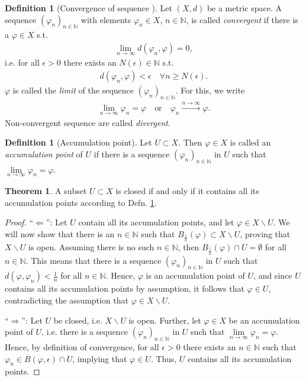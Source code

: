 \documentclass[12pt, a4paper]{article}
\numberwithin{equation}{section}
\theoremstyle{definition}
\theoremstyle{definition}
\newtheorem{defn}[thm]{Definition} %
\newtheorem{theorem}[thm]{Theorem}
\begin{document}
	\begin{defn}[Convergence of sequence \cite{fa2019}]\label{defn:convergence_sequence}
		Let $(X, d)$ be a metric space. A sequence $(\varphi_n)_{n\in\mathbb N}$ with elements $\varphi_n\in X$, $n\in\mathbb N$, is called \textit{convergent} if there is a $\varphi\in X$ s.t.
		\begin{align}
			\lim\limits_{n\to\infty}d(\varphi_n, \varphi) = 0,
		\end{align}
		i.e. for all $\epsilon > 0$ there exists an $N(\epsilon)\in\mathbb N$ s.t.
		\begin{align}
			d(\varphi_n, \varphi) < \epsilon \quad \forall n\geq N(\epsilon).
		\end{align}
		$\varphi$ is called the \textit{limit} of the sequence $(\varphi_n)_{n\in \mathbb N}$. For this, we write 
		\begin{align}
			\lim\limits_{n\to\infty}\varphi_n = \varphi \quad \text{or}\quad \varphi_n \overset{n \to\infty}{\longrightarrow} \varphi.
		\end{align}
		Non-convergent sequence are called \textit{divergent}.
	\end{defn}

	\begin{defn}[Accumulation point]\label{defn:accumulation_point}
		Let $U\subset X$. Then $\varphi\in X$ is called an \textit{accumulation point} of $U$ if there is a sequence $\left(\varphi_{n}\right)_{n\in \mathbb N}$ in $U$ such that $\lim\limits_{n\to\infty}\varphi_{n} = \varphi$.
	\end{defn}

	\begin{theorem}\label{thm:closed_set_acc_point}
		A subset $U \subset X$ is closed if and only if it contains all its accumulation points according to Defn. \ref{defn:accumulation_point}.
	\end{theorem}

	\begin{proof}
		\enquote{$\Longleftarrow$}: Let $U$ contain all its accumulation points, and let $\varphi\in X\backslash U$. We will now show that there is an $n\in \mathbb N$ such that $B_{\frac{1}{n}}(\varphi) \subset X\backslash U$, proving that $X\backslash U$ is open. Assuming there is no such $n\in \mathbb N$, then $B_{\frac{1}{n}}(\varphi) \cap U = \emptyset$ for all $n\in \mathbb N$. This means that there is a sequence $(\varphi_{n})_{n\in\mathbb N}$ in $U$ such that $d(\varphi, \varphi_n) < \frac{1}{n}$ for all $n\in\mathbb N$. Hence, $\varphi$ is an accumulation point of $U$, and since $U$ contains all its accumulation points by assumption, it follows that $\varphi\in U$, contradicting the assumption that $\varphi\in X\backslash U$.
		
		\enquote{$\Longrightarrow$}: Let $U$ be closed, i.e. $X\backslash U$ is open. Further, let $\varphi\in X$ be an accumulation point of $U$, i.e. there is a sequence $(\varphi_n)_{n\in\mathbb N}$ in $U$ such that $\lim\limits_{n\to\infty}\varphi_n = \varphi$. Hence, by definition of convergence, for all $\epsilon > 0$ there exists an $n\in\mathbb N$ such that $\varphi_n\in B(\varphi, \epsilon) \cap U$, implying that $\varphi\in U$. Thus, $U$ contains all its accumulation points.
	\end{proof}
	
\end{document}
